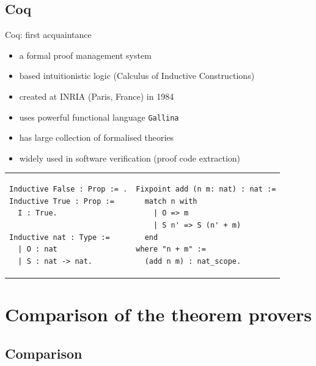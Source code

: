 \documentclass[aspectratio=169, 12pt, fleqn]{beamer}
\begin{document}
\subsection{Coq}


\begin{frame}[fragile]{Coq: first acquaintance}

\vspace{10pt}
\begin{itemize}
  \item a formal proof management system
  \item based intuitionistic logic \textcolor{dkgray}{ (Calculus of Inductive Constructions) }
  \item created at INRIA (Paris, France) in 1984
  \item \textcolor{dkgray}{ uses powerful functional language \texttt{Gallina} }
  \item \textcolor{dkgray}{ has large collection of formalised theories }
  \item \textcolor{dkgray}{ widely used in software verification (proof code extraction) }
\end{itemize}


\begin{tabular}{p{.48\linewidth} p{.53\linewidth}}
\begin{lstlisting}[language=coq, caption={Definition of basic datatypes 
%in Isabelle:
}]
Inductive False : Prop := .
Inductive True : Prop := 
  I : True.

Inductive nat : Type :=
  | O : nat
  | S : nat -> nat.
\end{lstlisting}
&
\begin{lstlisting}[language=coq,caption={Definition of addition over \texttt{nat}}]
Fixpoint add (n m: nat) : nat :=
  match n with
    | O => m
    | S n' => S (n' + m)
  end
where "n + m" :=
  (add n m) : nat_scope.
\end{lstlisting}
\end{tabular}

\end{frame}



\section{Comparison of the theorem provers}

\subsection{Comparison}
\end{document}
